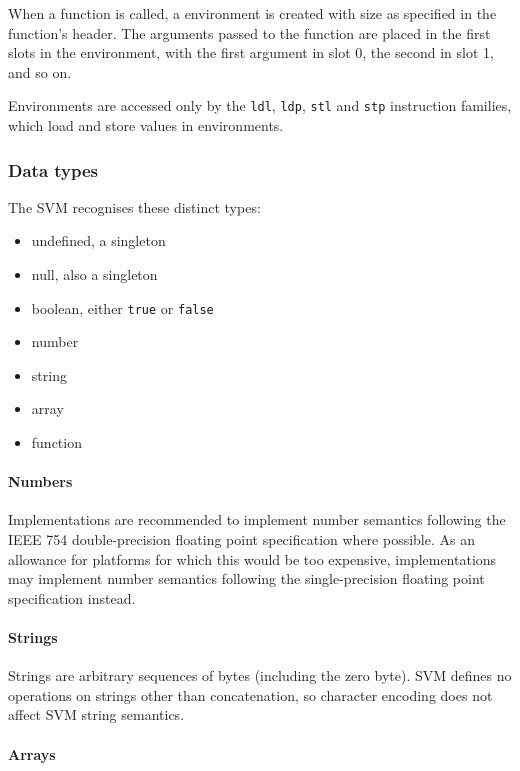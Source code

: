 When a function is called, a environment is created with size as
specified in the function's header. The arguments passed to the function
are placed in the first slots in the environment, with the first
argument in slot 0, the second in slot 1, and so on.

Environments are accessed only by the \texttt{ldl}, \texttt{ldp},
\texttt{stl} and \texttt{stp} instruction families, which load and store
values in environments.

\subsubsection{Data types}

The SVM recognises these distinct types:

\begin{itemize}
\item
  undefined, a singleton
\item
  null, also a singleton
\item
  boolean, either \texttt{true} or \texttt{false}
\item
  number
\item
  string
\item
  array
\item
  function
\end{itemize}

\paragraph{Numbers}

Implementations are recommended to implement number semantics following
the IEEE 754 double-precision floating point specification where
possible. As an allowance for platforms for which this would be too
expensive, implementations may implement number semantics following the
single-precision floating point specification instead.

\paragraph{Strings}

Strings are arbitrary sequences of bytes (including the zero byte). SVM
defines no operations on strings other than concatenation, so character
encoding does not affect SVM string semantics.

\paragraph{Arrays}

